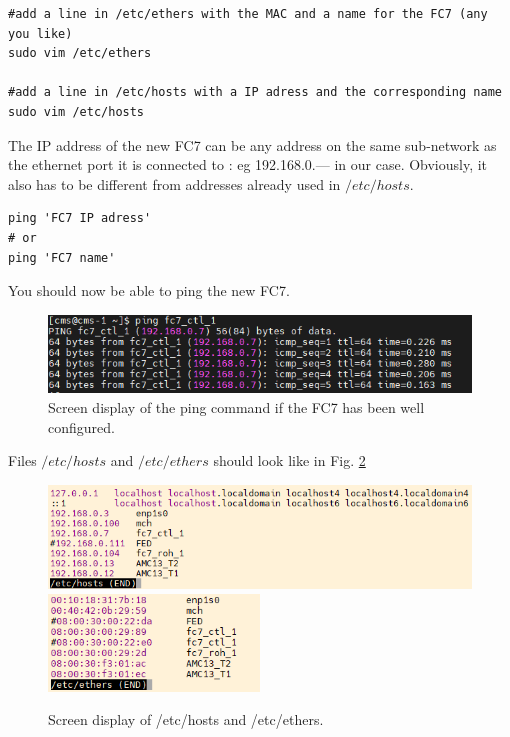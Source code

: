 \documentclass[10pt,a4paper]{article}
\begin{document}
\begin{framed}
\begin{verbatim}
#add a line in /etc/ethers with the MAC and a name for the FC7 (any you like)
sudo vim /etc/ethers 

#add a line in /etc/hosts with a IP adress and the corresponding name
sudo vim /etc/hosts  
\end{verbatim}
\end{framed}

The IP address of the new FC7 can be any address on the same sub-network as the ethernet port it is connected to : eg 192.168.0.---  in our case. Obviously, it also has to be different from addresses already used in $/etc/hosts $.

\begin{framed}
\begin{verbatim}
ping 'FC7 IP adress'
# or
ping 'FC7 name'
\end{verbatim}
\end{framed}

You should now be able to ping the new FC7. 

\begin{figure}[h!]
\centering
 \includegraphics[width=0.8\linewidth]{PingResponse.png} 
  \caption{Screen display of the ping command if the FC7 has been well configured.}
  \label{GoodPing2}
\end{figure}

Files $/etc/hosts$ and $/etc/ethers$ should look like in Fig. \ref{GoodHosts}

\begin{figure}[h!]
\centering
        \includegraphics[width=\textwidth]{hosts.png}
        \includegraphics[width=0.5\textwidth]{ethers.png}
  \caption{Screen display of /etc/hosts and /etc/ethers.}
  \label{GoodHosts}
\end{figure}
\end{document}
